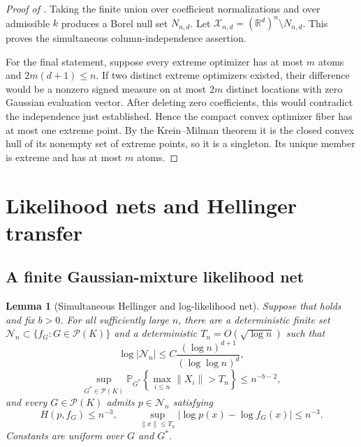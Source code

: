 \documentclass[11pt]{article}
\newtheorem{lemma}{Lemma}
\theoremstyle{definition}
\theoremstyle{remark}
\newcommand{\Pcal}{\mathcal P}
\newcommand{\Ncal}{\mathcal N}
\newcommand{\RR}{\mathbb R}
\newcommand{\PP}{\mathbb P}
\newcommand{\norm}[1]{\lVert #1\rVert}
\newcommand{\abs}[1]{\lvert #1\rvert}
\begin{document}
\begin{proof}[Proof of ]
Taking the finite union over coefficient normalizations
and over admissible $k$ produces a Borel null set $N_{n,d}$.  Let
$\mathcal X_{n,d}=(\RR^d)^n\setminus N_{n,d}$.  This proves the simultaneous
column-independence assertion.

For the final statement, suppose every extreme optimizer has at most $m$
atoms and $2m(d+1)\le n$.  If two distinct extreme optimizers existed, their
difference would be a nonzero signed measure on at most $2m$ distinct
locations with zero Gaussian evaluation vector.  After deleting zero
coefficients, this would contradict the independence just established.
Hence the compact convex optimizer fiber has at most one extreme point.  By
the Krein--Milman theorem it is the closed convex hull of its nonempty set of
extreme points, so it is a singleton.  Its unique member is extreme and has
at most $m$ atoms.
\end{proof}

\section{Likelihood nets and Hellinger transfer}
\label{app:hellinger}

\subsection{A finite Gaussian-mixture likelihood net}

\begin{lemma}[Simultaneous Hellinger and log-likelihood net]
\label{lem:finite-net}
Suppose that  holds and fix $b>0$.  For all
sufficiently large $n$, there are a deterministic finite set
$\Ncal_n\subset\{f_G:G\in\Pcal(K)\}$ and a deterministic
$T_n=O(\sqrt{\log n})$ such that
\begin{equation}\label{eq:net-size}
 \log\abs{\Ncal_n}
 \le C\frac{(\log n)^{d+1}}{(\log\log n)^d},
\end{equation}
\begin{equation}\label{eq:radius-prob}
 \sup_{G^*\in\Pcal(K)}
 \PP_{G^*}\left\{\max_{i\le n}\norm{X_i}>T_n\right\}
 \le n^{-b-2},
\end{equation}
and every $G\in\Pcal(K)$ admits $p\in\Ncal_n$ satisfying
\begin{equation}\label{eq:net-approx}
 H(p,f_G)\le n^{-3},
 \qquad
 \sup_{\norm{x}\le T_n}\abs{\log p(x)-\log f_G(x)}\le n^{-3}.
\end{equation}
Constants are uniform over $G$ and $G^*$.
\end{lemma}
\end{document}

